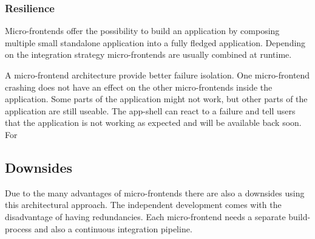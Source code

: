 \subsubsection{Resilience}

Micro-frontends offer the possibility to build an application by composing multiple small standalone application into a fully fledged application. Depending on the integration strategy micro-frontends are usually combined at runtime. 

A micro-frontend architecture provide better failure isolation. One micro-frontend crashing does not have an effect on the other micro-frontends inside the application. Some parts of the application might not work, but other parts of the application are still useable. The app-shell can react to a failure and tell users that the application is not working as expected and will be available back soon. For

\subsection{Downsides}

Due to the many advantages of micro-frontends there are also a downsides using this architectural approach. The independent development comes with the disadvantage of having redundancies. Each micro-frontend needs a separate build-process and also a continuous integration pipeline.
\cite{book:2020:geers:micro-frontends-in-action}







